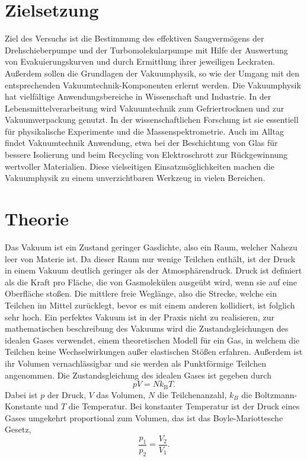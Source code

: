 
\section{Zielsetzung}
\label{sec:Zielsetzung}
Ziel des Versuchs ist die Bestimmung des effektiven Saugvermögens der Drehschieberpumpe und der Turbomolekularpumpe
mit Hilfe der Auswertung von Evakuierungskurven und durch Ermittlung ihrer jeweiligen 
Leckraten. Außerdem sollen die Grundlagen der Vakuumphysik, so wie der Umgang mit den entsprechenden Vakuumtechnik-Komponenten
erlernt werden. Die Vakuumphysik hat vielfältige Anwendungsbereiche in Wissenschaft und Industrie. In der Lebensmittelverarbeitung 
wird Vakuumtechnik zum Gefriertrocknen und zur Vakuumverpackung genutzt. In der wissenschaftlichen Forschung ist sie essentiell
für physikalische Experimente und die Massenspektrometrie. Auch im Alltag findet Vakuumtechnik Anwendung, etwa bei der Beschichtung 
von Glas für bessere Isolierung und beim Recycling von Elektroschrott zur Rückgewinnung wertvoller Materialien. Diese vielseitigen 
Einsatzmöglichkeiten machen die Vakuumphysik zu einem unverzichtbaren Werkzeug in vielen Bereichen.

\section{Theorie}
\label{sec:Theorie}

Das Vakuum ist ein Zustand geringer Gasdichte, also ein Raum, welcher Nahezu leer von Materie ist.
Da dieser Raum nur wenige Teilchen enthält, ist der Druck in einem Vakuum deutlich geringer als der Atmosphärendruck.
Druck ist definiert als die Kraft pro Fläche, die von Gasmolekülen ausgeübt wird, wenn sie auf
eine Oberfläche stoßen. Die mittlere freie Weglänge, also die Strecke, welche ein Teilchen im Mittel zurücklegt, bevor es
mit einem anderen kollidiert, ist folglich sehr hoch. Ein perfektes Vakuum ist in der Praxis nicht zu realisieren, zur mathematischen 
beschreibung des Vakuums wird die Zustandsgleichungen des idealen Gases verwendet, einem theoretischen Modell für ein 
Gas, in welchem die Teilchen keine Wechselwirkungen außer elastischen Stößen erfahren. Außerdem ist ihr Volumen vernachlässigbar 
und sie werden als Punktförmige Teilchen angenommen.
Die Zustandsgleichung des idealen Gases ist gegeben durch
\begin{equation}
     p V=N k_\text{B} T .
    \label{eq:idealgaslaw}
\end{equation}  
Dabei ist \( p \) der Druck, \( V \) das Volumen, \( N \) die Teilchenanzahl, \( k_B \) die Boltzmann-Konstante
 und \( T \) die Temperatur.
Bei konstanter Temperatur ist der Druck eines Gases umgekehrt proportional zum Volumen, das ist das Boyle-Mariottesche Gesetz,
\begin{equation}
    \frac{p_1}{p_2}=  \frac{V_2}{V_1}.
    \label{eq:boylemariotte}
\end{equation}


